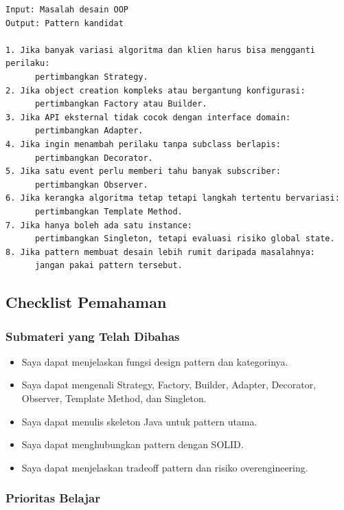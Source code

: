 \begin{lstlisting}[caption={Pseudocode pemilihan design pattern}, label={lst:pattern-choice}]
Input: Masalah desain OOP
Output: Pattern kandidat

1. Jika banyak variasi algoritma dan klien harus bisa mengganti perilaku:
      pertimbangkan Strategy.
2. Jika object creation kompleks atau bergantung konfigurasi:
      pertimbangkan Factory atau Builder.
3. Jika API eksternal tidak cocok dengan interface domain:
      pertimbangkan Adapter.
4. Jika ingin menambah perilaku tanpa subclass berlapis:
      pertimbangkan Decorator.
5. Jika satu event perlu memberi tahu banyak subscriber:
      pertimbangkan Observer.
6. Jika kerangka algoritma tetap tetapi langkah tertentu bervariasi:
      pertimbangkan Template Method.
7. Jika hanya boleh ada satu instance:
      pertimbangkan Singleton, tetapi evaluasi risiko global state.
8. Jika pattern membuat desain lebih rumit daripada masalahnya:
      jangan pakai pattern tersebut.
\end{lstlisting}

\subsection{Checklist Pemahaman}

\subsubsection{Submateri yang Telah Dibahas}

\begin{itemize}
    \item[$\square$] Saya dapat menjelaskan fungsi design pattern dan kategorinya.
    \item[$\square$] Saya dapat mengenali Strategy, Factory, Builder, Adapter, Decorator, Observer, Template Method, dan Singleton.
    \item[$\square$] Saya dapat menulis skeleton Java untuk pattern utama.
    \item[$\square$] Saya dapat menghubungkan pattern dengan SOLID.
    \item[$\square$] Saya dapat menjelaskan tradeoff pattern dan risiko overengineering.
\end{itemize}

\subsubsection{Prioritas Belajar}

